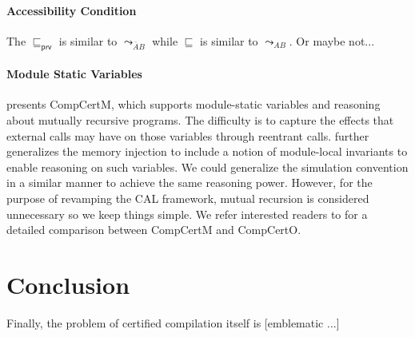 \documentclass[acmsmall,screen,review,anonymous]{acmart}
\newcommand{\kw}[1]{\ensuremath{ \mathsf{#1} }}
\begin{document}
\paragraph{Accessibility Condition}

The $\sqsubseteq_{\kw{prv}}$ is similar to $\leadsto_{\bar{A}B}$
while $\sqsubseteq$ is similar to $\leadsto_{AB}$. Or maybe not...

\paragraph{Module Static Variables}

\citet{compcertm} presents CompCertM,
which supports module-static variables
and reasoning about mutually recursive programs.
The difficulty is to capture the effects that external calls may have on
those variables through reentrant calls.
\citet{compcertm} further generalizes the memory injection
to include a notion of module-local invariants
to enable reasoning on such variables.
We could generalize the simulation convention in a similar manner
to achieve the same reasoning power.
However, for the purpose of revamping the CAL framework,
mutual recursion is considered unnecessary
so we keep things simple.
We refer interested readers to \citet{compcerto}
for a detailed comparison between CompCertM and CompCertO.


\section{Conclusion} %

Finally,
the problem of certified compilation itself
is [emblematic ...]




\appendix

\newpage
\end{document}
